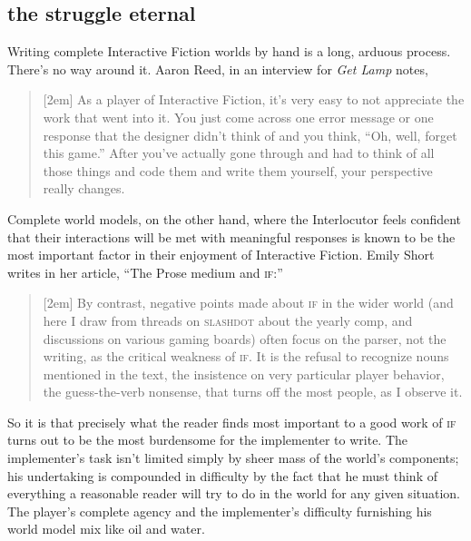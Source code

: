 \subsection{the struggle eternal}
Writing complete Interactive
  Fiction worlds by hand is a long, arduous process. There's no way around it. 
Aaron Reed, in an interview for \textit{Get Lamp} notes,
\begin{quote}
[2em]
As a player of Interactive Fiction, it's very easy to not appreciate the work
that went into it. You just come across one error message or one response that
the designer didn't think of and you think, ``Oh, well, forget this game.''
After you've actually gone through and had to think of all those things and code
them and write them yourself, your perspective really changes.
\end{quote}

\noindent Complete world models, on the other hand, where the Interlocutor feels confident that their
interactions will be met with meaningful responses is known to be the most
important factor in their enjoyment of Interactive Fiction. Emily Short writes
in her article, ``The Prose medium and \textsc{if}:''
    \begin{quote}
    [2em]
    By contrast, negative points made about \textsc{if} in the wider world (and here I draw
    from threads on \textsc{slashdot} about the yearly comp, and discussions on various
    gaming boards) often focus on the parser, not the writing, as the critical
    weakness of \textsc{if}. It is the refusal to recognize nouns mentioned in the text, the
    insistence on very particular player behavior, the guess-the-verb nonsense,
    that turns off the most people, as I observe it.
    \end{quote}
So it is that precisely what the reader finds most important to a good work of
\textsc{if} turns out to be the most burdensome for the implementer to write.
The implementer's task isn't limited simply by sheer mass of the world's
components; his undertaking is compounded in difficulty by the fact that he must
think of everything a reasonable reader will try to do in the world for any
given situation. The player's complete agency and the implementer's difficulty
furnishing his world model mix like oil and water.

